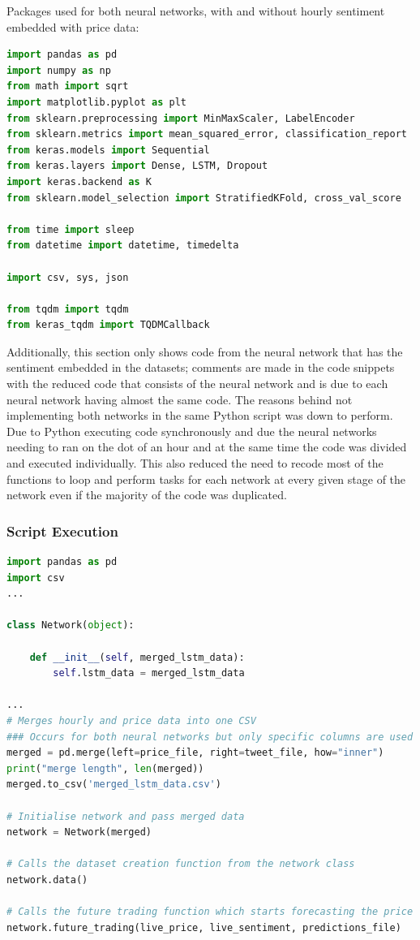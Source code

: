 \documentclass[oneside, 12pt]{article}
\begin{document}
		Packages used for both neural networks, with and without hourly sentiment embedded with price data:
		\begin{lstlisting}[language=python, caption=LSTM packages]
import pandas as pd
import numpy as np
from math import sqrt
import matplotlib.pyplot as plt
from sklearn.preprocessing import MinMaxScaler, LabelEncoder
from sklearn.metrics import mean_squared_error, classification_report 
from keras.models import Sequential
from keras.layers import Dense, LSTM, Dropout
import keras.backend as K
from sklearn.model_selection import StratifiedKFold, cross_val_score

from time import sleep
from datetime import datetime, timedelta

import csv, sys, json

from tqdm import tqdm
from keras_tqdm import TQDMCallback			
		\end{lstlisting}
		
		Additionally, this section only shows code from the neural network that has the sentiment embedded in the datasets; comments are made in the code snippets with the reduced code that consists of the neural network and is due to each neural network having almost the same code. The reasons behind not implementing both networks in the same Python script was down to perform. Due to Python executing code synchronously and due the neural networks needing to ran on the dot of an hour and at the same time the code was divided and executed individually. This also reduced the need to recode most of the functions to loop and perform tasks for each network at every given stage of the network even if the majority of the code was duplicated.
		\newpage
		
		\subsubsection{Script Execution}
		
		\begin{lstlisting}[language=python, caption=Start of execution of the LSTM script]
import pandas as pd
import csv
...

class Network(object):

	def __init__(self, merged_lstm_data):
		self.lstm_data = merged_lstm_data

...
# Merges hourly and price data into one CSV
### Occurs for both neural networks but only specific columns are used in each
merged = pd.merge(left=price_file, right=tweet_file, how="inner")
print("merge length", len(merged))
merged.to_csv('merged_lstm_data.csv')

# Initialise network and pass merged data
network = Network(merged)

# Calls the dataset creation function from the network class
network.data()

# Calls the future trading function which starts forecasting the price for next hour
network.future_trading(live_price, live_sentiment, predictions_file)

		\end{lstlisting}
		
\end{document}
